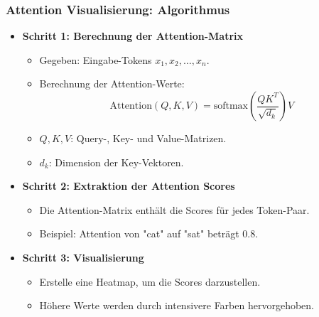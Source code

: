 \documentclass[aspectratio=1610, xcolor=dvipsnames, 9pt]{beamer}
\begin{document}
\begin{frame}
  \frametitle{Attention Visualisierung: Algorithmus}
  \begin{itemize}
    \item \textbf{Schritt 1: Berechnung der Attention-Matrix}
    \begin{itemize}
      \item Gegeben: Eingabe-Tokens $x_1, x_2, \dots, x_n$.
      \item Berechnung der Attention-Werte:
      \[
      \text{Attention}(Q, K, V) = \text{softmax}\left(\frac{QK^T}{\sqrt{d_k}}\right)V
      \]
      \item $Q, K, V$: Query-, Key- und Value-Matrizen.
      \item $d_k$: Dimension der Key-Vektoren.
    \end{itemize}
    \item \textbf{Schritt 2: Extraktion der Attention Scores}
    \begin{itemize}
      \item Die Attention-Matrix enthält die Scores für jedes Token-Paar.
      \item Beispiel: Attention von "cat" auf "sat" beträgt 0.8.
    \end{itemize}
    \item \textbf{Schritt 3: Visualisierung}
    \begin{itemize}
      \item Erstelle eine Heatmap, um die Scores darzustellen.
      \item Höhere Werte werden durch intensivere Farben hervorgehoben.
    \end{itemize}
  \end{itemize}
\end{frame}
\end{document}
